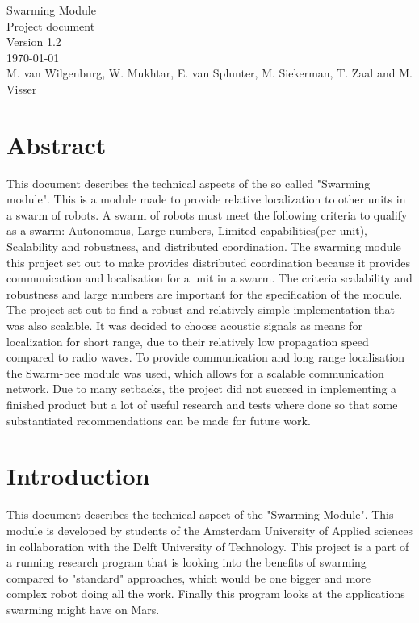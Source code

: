 \documentclass[10pt,a4paper]{article}
\begin{document}
\begin{titlepage}
    \centering
    \vfill
    {\Large

    Swarming Module\\

   
    {\small Project document}\\
    {\small Version 1.2}\\
    {\small \today}\\
        
        \vskip2cm
        {\small M. van Wilgenburg, W. Mukhtar, E. van Splunter, M. Siekerman, T. Zaal and M. Visser}\\
    }    
    \vfill
    
    \vfill
    \vfill
\end{titlepage}

\newpage

\listoffigures
\newpage

\listoftables
\newpage

\tableofcontents
\newpage

\section{Abstract}
This document describes the technical aspects of the so called "Swarming module". This is a module made to provide relative localization to other units in a swarm of robots. A swarm of robots must meet the following criteria to qualify as a swarm: Autonomous, Large numbers, Limited capabilities(per unit), Scalability and robustness, and distributed coordination. The swarming module this project set out to make provides distributed coordination because it provides communication and localisation for a unit in a swarm. The criteria scalability and robustness and large numbers are important for the specification of the module. The project set out to find a robust and relatively simple implementation that was also scalable. It was decided to choose acoustic signals as means for localization for short range, due to their relatively low propagation speed compared to radio waves. To provide communication and long range localisation the Swarm-bee module was used, which allows for a scalable communication network. Due to many setbacks, the project did not succeed in implementing a finished product but a lot of useful research and tests where done so that some substantiated recommendations can be made for future work.
\newpage

\section{Introduction}
This document describes the technical aspect of the "Swarming Module". This module is developed by students of the Amsterdam University of Applied sciences in collaboration with the Delft University of Technology.   This project is a part of a running research program that is looking into the benefits of swarming compared to "standard" approaches, which would be one bigger and more complex robot doing all the work. Finally this program looks at the applications swarming might have on Mars. 
\end{document}
